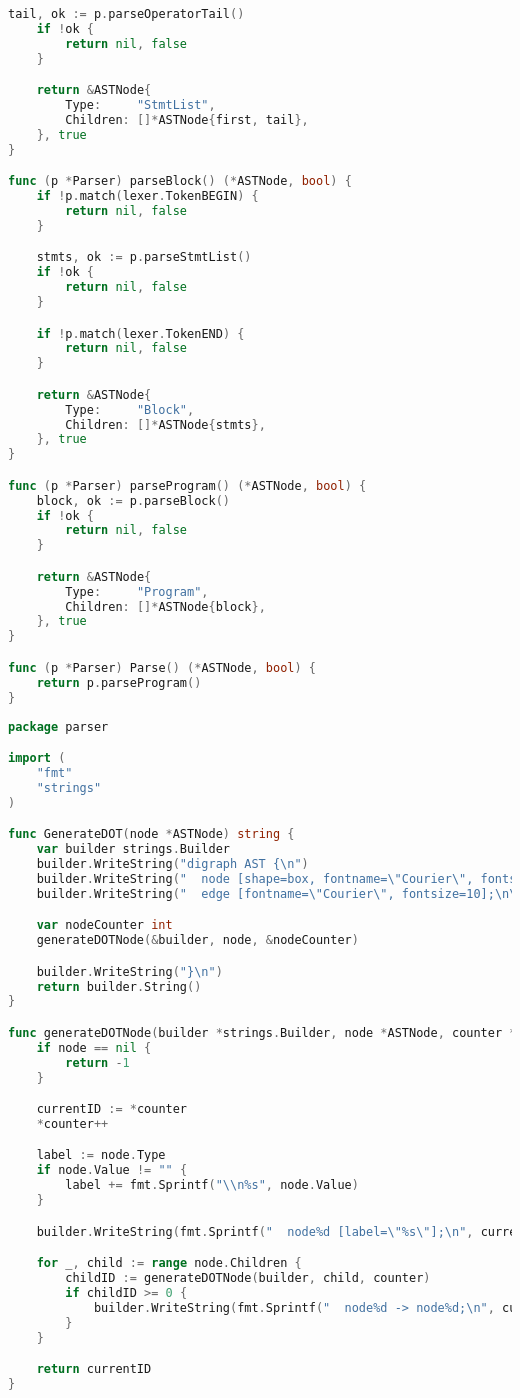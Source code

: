 \begin{lstlisting}[language=Go, caption={Код модуля \textit{grammar} --- устранение бесполезных символов}]
	tail, ok := p.parseOperatorTail()
	if !ok {
		return nil, false
	}

	return &ASTNode{
		Type:     "StmtList",
		Children: []*ASTNode{first, tail},
	}, true
}

func (p *Parser) parseBlock() (*ASTNode, bool) {
	if !p.match(lexer.TokenBEGIN) {
		return nil, false
	}

	stmts, ok := p.parseStmtList()
	if !ok {
		return nil, false
	}

	if !p.match(lexer.TokenEND) {
		return nil, false
	}

	return &ASTNode{
		Type:     "Block",
		Children: []*ASTNode{stmts},
	}, true
}

func (p *Parser) parseProgram() (*ASTNode, bool) {
	block, ok := p.parseBlock()
	if !ok {
		return nil, false
	}

	return &ASTNode{
		Type:     "Program",
		Children: []*ASTNode{block},
	}, true
}

func (p *Parser) Parse() (*ASTNode, bool) {
	return p.parseProgram()
}
\end{lstlisting}

\begin{lstlisting}[language=Go, caption={Код модуля \textit{parser}}]
package parser

import (
	"fmt"
	"strings"
)

func GenerateDOT(node *ASTNode) string {
	var builder strings.Builder
	builder.WriteString("digraph AST {\n")
	builder.WriteString("  node [shape=box, fontname=\"Courier\", fontsize=10];\n")
	builder.WriteString("  edge [fontname=\"Courier\", fontsize=10];\n\n")

	var nodeCounter int
	generateDOTNode(&builder, node, &nodeCounter)

	builder.WriteString("}\n")
	return builder.String()
}

func generateDOTNode(builder *strings.Builder, node *ASTNode, counter *int) int {
	if node == nil {
		return -1
	}

	currentID := *counter
	*counter++

	label := node.Type
	if node.Value != "" {
		label += fmt.Sprintf("\\n%s", node.Value)
	}

	builder.WriteString(fmt.Sprintf("  node%d [label=\"%s\"];\n", currentID, label))

	for _, child := range node.Children {
		childID := generateDOTNode(builder, child, counter)
		if childID >= 0 {
			builder.WriteString(fmt.Sprintf("  node%d -> node%d;\n", currentID, childID))
		}
	}

	return currentID
}
\end{lstlisting}

